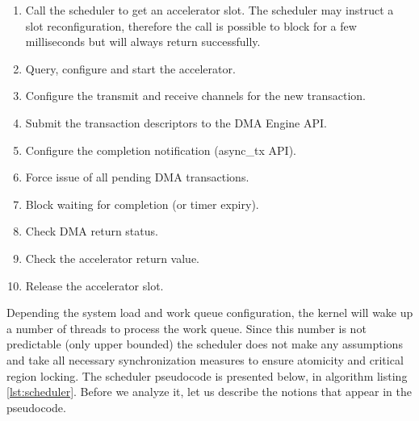 \begin{enumerate}
\item	Call the scheduler to get an accelerator slot. The scheduler may instruct a
	slot reconfiguration, therefore the call is possible to block for a few milliseconds
	but will always return successfully.
\item	Query, configure and start the accelerator.
\item	Configure the transmit and receive channels for the new transaction.
\item	Submit the transaction descriptors to the DMA Engine API.
\item	Configure the completion notification (async\_tx API).
\item	Force issue of all pending DMA transactions.
\item	Block waiting for completion (or timer expiry).
\item	Check DMA return status.
\item	Check the accelerator return value.
\item	Release the accelerator slot.
\end{enumerate}

Depending the system load and work queue configuration, the kernel will wake up
a number of threads to process the work queue. Since this number is not predictable
(only upper bounded) the scheduler does not make any assumptions and take all necessary
synchronization measures to ensure atomicity and critical region locking.
The scheduler pseudocode is presented below, in algorithm listing \ref{lst:scheduler}.
Before we analyze it, let us describe the notions that appear in the pseudocode.

